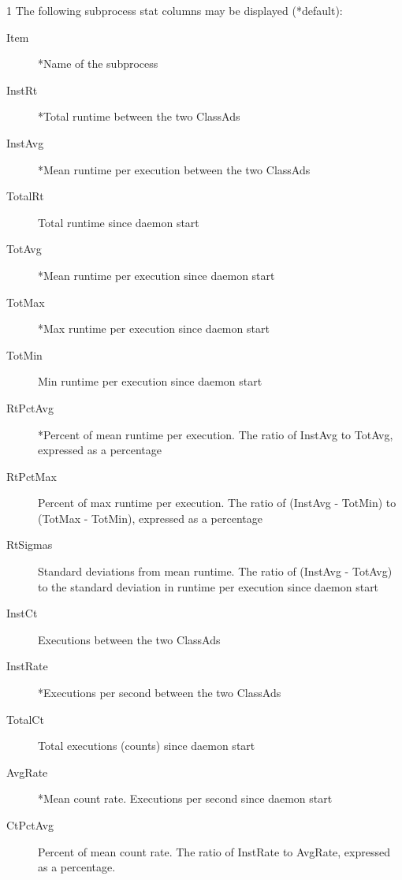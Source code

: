 \begin{ManPage}{\label{man-condor-top}}{1}
The following subprocess stat columns may be displayed (*default):
\begin{description}
\item[Item]{*Name of the subprocess}
\item[InstRt]{*Total runtime between the two ClassAds}
\item[InstAvg]{*Mean runtime per execution between the two ClassAds}
\item[TotalRt]{Total runtime since daemon start}
\item[TotAvg]{*Mean runtime per execution since daemon start}
\item[TotMax]{*Max runtime per execution since daemon start}
\item[TotMin]{Min runtime per execution since daemon start}
\item[RtPctAvg]{*Percent of mean runtime per execution. The ratio of InstAvg to TotAvg, expressed as a percentage}
\item[RtPctMax]{Percent of max runtime per execution. The ratio of (InstAvg - TotMin) to (TotMax - TotMin), expressed as a percentage}
\item[RtSigmas]{Standard deviations from mean runtime. The ratio of (InstAvg - TotAvg) to the standard deviation in runtime per execution since daemon start}
\item[InstCt]{Executions between the two ClassAds}
\item[InstRate]{*Executions per second between the two ClassAds}
\item[TotalCt]{Total executions (counts) since daemon start}
\item[AvgRate]{*Mean count rate. Executions per second since daemon start}
\item[CtPctAvg]{Percent of mean count rate. The ratio of InstRate to AvgRate, expressed as a percentage.}
\end{description}

\begin{Options}


\end{Options}
\end{ManPage}
